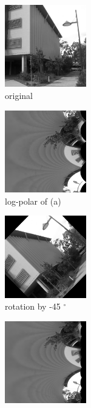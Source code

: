 \begin{figure}[t!] 
        \centering
        \begin{subfigure}[b]{1.5in}
                \includegraphics[width=1.4in]{images/pc/original}
                \caption{original}
                \label{fig:PCSecOrig2}
        \end{subfigure}%
        \begin{subfigure}[b]{1.5in}
                \includegraphics[width=1.4in]{images/pc/logpolar}
                \caption{log-polar of (a)}
                \label{fig:PCSecLP}
        \end{subfigure}%
         \begin{subfigure}[b]{1.5in}
                \includegraphics[width=1.4in]{images/pc/rotation}
                \caption{rotation by -45 ${}^{\circ}$}
                \label{fig:PCSecRot}
        \end{subfigure}%
        \begin{subfigure}[b]{1.5in}
                \includegraphics[width=1.4in]{images/pc/logpolarRotation}

\end{subfigure}
\end{figure}
